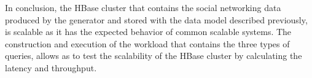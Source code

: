 In conclusion, the HBase cluster that contains the social networking data produced by the generator and stored with the data model described previously, is 
scalable as it has the expected behavior of common scalable systems. 
The construction and execution of the workload that contains the three types of queries, allows as to test the scalability of the HBase cluster 
by calculating the latency and throughput. 





